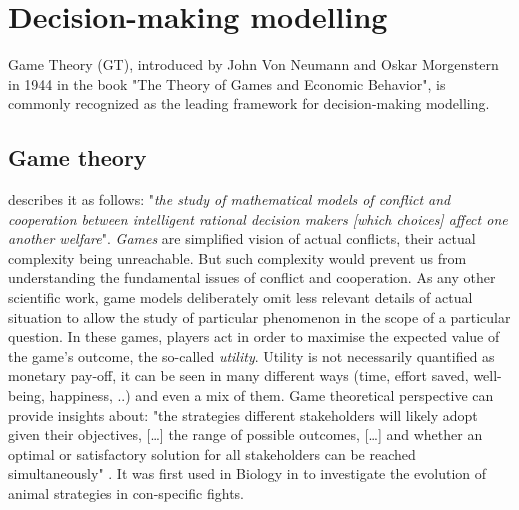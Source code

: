 \documentclass[12pt,a4paper]{article}
\begin{document}
\section{Decision-making modelling}

Game Theory (GT), introduced by John Von Neumann and Oskar Morgenstern in 1944 in the book "The Theory of Games and Economic Behavior", is commonly recognized as the leading framework for decision-making modelling.

\subsection{Game theory}
\cite{myerson1997game} describes it as follows: "\textit{the study of mathematical models of conflict and cooperation between intelligent rational decision makers [which choices] affect one another welfare}".
\textit{Games} are simplified vision of actual conflicts, their actual complexity being unreachable.
But such complexity would prevent us from understanding the fundamental issues of conflict and cooperation.
As any other scientific work, game models deliberately omit less relevant details of actual situation to allow the study of particular phenomenon in the scope of a particular question.
In these games, players act in order to maximise the expected value of the game's outcome, the so-called \textit{utility}.
Utility is not necessarily quantified as monetary pay-off, it can be seen in many different ways (time, effort saved, well-being, happiness, ..) and even a mix of them.
Game theoretical perspective can provide insights about: "the strategies different stakeholders will likely adopt given their objectives, [\dots] the range of possible outcomes, [\dots] and whether an optimal or satisfactory solution for all stakeholders can be reached simultaneously" \citep{COLYVAN20111246}.
It was first used in Biology in \cite{maynard1973logic} to investigate the evolution of animal strategies in con-specific fights.
\end{document}
